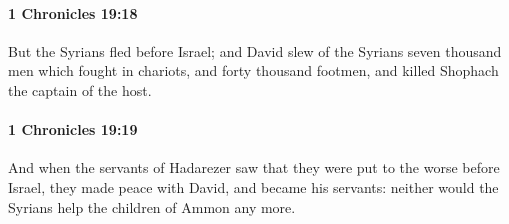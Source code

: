		\paragraph{1 Chronicles 19:18} %
			\label{1CHRONICLES-19-18}

			But the Syrians fled before Israel; and David slew of the Syrians seven thousand men which fought in chariots, and forty thousand footmen, and killed Shophach the captain of the host.


		\paragraph{1 Chronicles 19:19} %
			\label{1CHRONICLES-19-19}

			And when the servants of Hadarezer saw that they were put to the worse before Israel, they made peace with David, and became his servants: neither would the Syrians help the children of Ammon any more.

